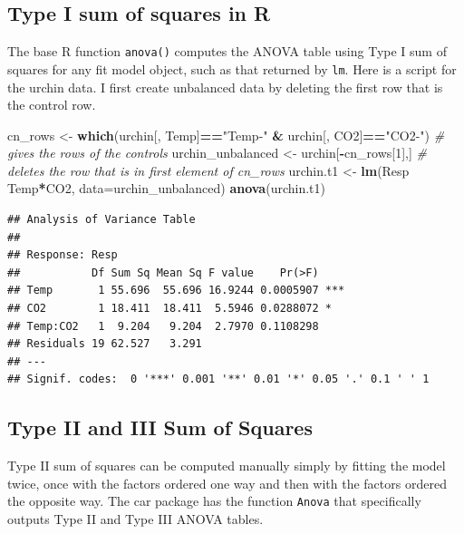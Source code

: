\documentclass[]{book}
\newenvironment{Shaded}{\begin{snugshade}}{\end{snugshade}}
\newcommand{\CommentTok}[1]{\textcolor[rgb]{0.56,0.35,0.01}{\textit{#1}}}
\newcommand{\DataTypeTok}[1]{\textcolor[rgb]{0.13,0.29,0.53}{#1}}
\newcommand{\DecValTok}[1]{\textcolor[rgb]{0.00,0.00,0.81}{#1}}
\newcommand{\KeywordTok}[1]{\textcolor[rgb]{0.13,0.29,0.53}{\textbf{#1}}}
\newcommand{\NormalTok}[1]{#1}
\newcommand{\OperatorTok}[1]{\textcolor[rgb]{0.81,0.36,0.00}{\textbf{#1}}}
\newcommand{\StringTok}[1]{\textcolor[rgb]{0.31,0.60,0.02}{#1}}
\begin{document}
\hypertarget{type-i-sum-of-squares-in-r}{%
\subsection{Type I sum of squares in R}\label{type-i-sum-of-squares-in-r}}

The base R function \texttt{anova()} computes the ANOVA table using Type I sum of squares for any fit model object, such as that returned by \texttt{lm}. Here is a script for the urchin data. I first create unbalanced data by deleting the first row that is the control row.

\begin{Shaded}
\begin{Highlighting}[]
\NormalTok{cn_rows <-}\StringTok{ }\KeywordTok{which}\NormalTok{(urchin[, Temp]}\OperatorTok{==}\StringTok{"Temp-"} \OperatorTok{&}\StringTok{ }\NormalTok{urchin[, CO2]}\OperatorTok{==}\StringTok{"CO2-"}\NormalTok{) }\CommentTok{# gives the rows of the controls}
\NormalTok{urchin_unbalanced <-}\StringTok{ }\NormalTok{urchin[}\OperatorTok{-}\NormalTok{cn_rows[}\DecValTok{1}\NormalTok{],] }\CommentTok{# deletes the row that is in first element of cn_rows}
\NormalTok{urchin.t1 <-}\StringTok{ }\KeywordTok{lm}\NormalTok{(Resp }\OperatorTok{~}\StringTok{ }\NormalTok{Temp}\OperatorTok{*}\NormalTok{CO2, }\DataTypeTok{data=}\NormalTok{urchin_unbalanced)}
\KeywordTok{anova}\NormalTok{(urchin.t1)}
\end{Highlighting}
\end{Shaded}

\begin{verbatim}
## Analysis of Variance Table
## 
## Response: Resp
##           Df Sum Sq Mean Sq F value    Pr(>F)    
## Temp       1 55.696  55.696 16.9244 0.0005907 ***
## CO2        1 18.411  18.411  5.5946 0.0288072 *  
## Temp:CO2   1  9.204   9.204  2.7970 0.1108298    
## Residuals 19 62.527   3.291                      
## ---
## Signif. codes:  0 '***' 0.001 '**' 0.01 '*' 0.05 '.' 0.1 ' ' 1
\end{verbatim}

\hypertarget{type-ii-and-iii-sum-of-squares}{%
\subsection{Type II and III Sum of Squares}\label{type-ii-and-iii-sum-of-squares}}

Type II sum of squares can be computed manually simply by fitting the model twice, once with the factors ordered one way and then with the factors ordered the opposite way. The car package has the function \texttt{Anova} that specifically outputs Type II and Type III ANOVA tables.
\end{document}
